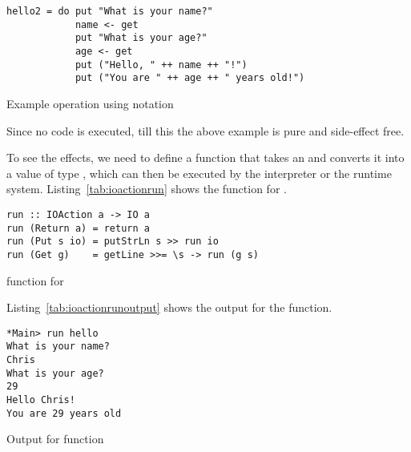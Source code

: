 \documentclass[thesis-solanki.tex]{subfiles}
\begin{document}
\begin{code-list}[H]
\begin{singlespace}
\begin{verbatim}
hello2 = do put "What is your name?"
            name <- get
            put "What is your age?"
            age <- get
            put ("Hello, " ++ name ++ "!")
            put ("You are " ++ age ++ " years old!")
\end{verbatim}
\end{singlespace}
\caption{Example operation using  notation}
\label{tab:ioactionexampledo}
\end{code-list}

Since no code is executed, till this the above example is pure and side-effect free.

To see the effects, we need to define a function that takes an   and converts it into a 
value of type  , which can then be executed by the interpreter or the runtime system. 
Listing~\ref{tab:ioactionrun} shows the  function for .


\begin{code-list}[H]
\begin{singlespace}
\begin{verbatim}
run :: IOAction a -> IO a
run (Return a) = return a
run (Put s io) = putStrLn s >> run io
run (Get g)    = getLine >>= \s -> run (g s)
\end{verbatim}
\end{singlespace}
\caption{ function for }
\label{tab:ioactionrun}
\end{code-list}

Listing~\ref{tab:ioactionrunoutput} shows the output for the  function.

\begin{code-list}[H]
\begin{singlespace}
\begin{verbatim}
*Main> run hello
What is your name?
Chris
What is your age?
29
Hello Chris!
You are 29 years old
\end{verbatim}
\end{singlespace}
\caption{Output for  function}
\label{tab:ioactionrunoutput}
\end{code-list}
\end{document}
